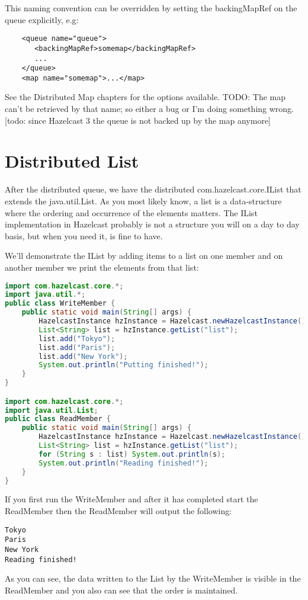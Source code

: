 This naming convention can be overridden by setting the backingMapRef on the queue explicitly, e.g:
\begin{lstlisting}
    <queue name="queue">
       <backingMapRef>somemap</backingMapRef>
       ... 
    </queue>
    <map name="somemap">...</map>
\end{lstlisting}
See the Distributed Map chapters for the options available.
TODO: The map can't be retrieved by that name; so either a bug or I'm doing something wrong.
[todo: since Hazelcast 3 the queue is not backed up by the map anymore]

\section{Distributed List}
After the distributed queue, we have the distributed com.hazelcast.core.IList that extends the java.util.List. As you most likely know, a list is a data-structure where the ordering and occurrence of the elements matters. The IList implementation in Hazelcast probably is not a structure you will on a day to day basis, but when you need it, is fine to have.

We'll demonstrate the IList by adding items to a list on one member and on another member we print the elements from that list:
\begin{lstlisting}[language=java]
import com.hazelcast.core.*;
import java.util.*;
public class WriteMember {
    public static void main(String[] args) {
        HazelcastInstance hzInstance = Hazelcast.newHazelcastInstance();
        List<String> list = hzInstance.getList("list");
        list.add("Tokyo");
        list.add("Paris");
        list.add("New York");
        System.out.println("Putting finished!");
    }
}

import com.hazelcast.core.*;
import java.util.List;
public class ReadMember {
    public static void main(String[] args) {
        HazelcastInstance hzInstance = Hazelcast.newHazelcastInstance();
        List<String> list = hzInstance.getList("list");
        for (String s : list) System.out.println(s);
        System.out.println("Reading finished!");
    }
}
\end{lstlisting}
If you first run the WriteMember and after it has completed start the ReadMember then the ReadMember will output the following:
\begin{lstlisting}
Tokyo
Paris
New York
Reading finished!
\end{lstlisting}
As you can see, the data written to the List by the WriteMember is visible in the ReadMember and you also can see that the order is maintained.

